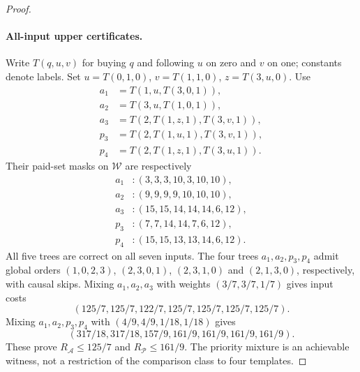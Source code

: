 \begin{proof}
\paragraph*{All-input upper certificates.}
Write $T(q,u,v)$ for buying $q$ and following $u$ on zero and $v$ on
one; constants denote labels. Set $u=T(0,1,0)$, $v=T(1,1,0)$,
$z=T(3,u,0)$. Use
\begin{align*}
 a_1&=T(1,u,T(3,0,1)),\\
 a_2&=T(3,u,T(1,0,1)),\\
 a_3&=T(2,T(1,z,1),T(3,v,1)),\\
 p_3&=T(2,T(1,u,1),T(3,v,1)),\\
 p_4&=T(2,T(1,z,1),T(3,u,1)).
\end{align*}
Their paid-set masks on $\mathcal W$ are respectively
\begin{align*}
 a_1 &: (3,3,3,10,3,10,10),\\
 a_2 &: (9,9,9,9,10,10,10),\\
 a_3 &: (15,15,14,14,14,6,12),\\
 p_3 &: (7,7,14,14,7,6,12),\\
 p_4 &: (15,15,13,13,14,6,12).
\end{align*}
All five trees are correct on all seven inputs. The four trees
$a_1,a_2,p_3,p_4$ admit global orders $(1,0,2,3)$, $(2,3,0,1)$,
$(2,3,1,0)$ and $(2,1,3,0)$, respectively, with causal skips.
Mixing $a_1,a_2,a_3$ with weights $(3/7,3/7,1/7)$ gives input costs
\[
 (125/7,125/7,122/7,125/7,125/7,125/7,125/7).
\]
Mixing $a_1,a_2,p_3,p_4$ with $(4/9,4/9,1/18,1/18)$ gives
\[
 (317/18,317/18,157/9,161/9,161/9,161/9,161/9).
\]
These prove $R_{\mathcal A}\leq125/7$ and
$R_{\mathcal P}\leq161/9$. The priority mixture is an achievable
witness, not a restriction of the comparison class to four templates.


\end{proof}
